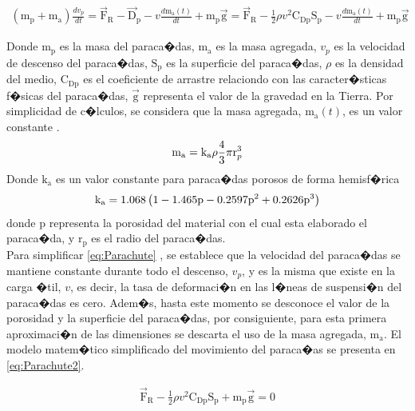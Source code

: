 \documentclass[10pt,a4paper]{book}
\begin{document}
\begin{align}
\label{eq:Parachute}
( \text{m}_{\text{p}} + \text{m}_{\text{a}}) \frac{dv_{p}}{dt} = \overrightarrow{\text{F}}_{\text{R}}- \overrightarrow{\text{D}}_{\text{p}} - v\frac{d\text{m}_{\text{a}}(t)}{dt} + \text{m}_{\text{p}}\overrightarrow{\text{g}}=\overrightarrow{\text{F}}_{\text{R}}- \frac{1}{2}\rho v^{2} \text{C}_{\text{Dp}}\text{S}_{\text{p}} - v\frac{d\text{m}_{\text{a}}(t)}{dt} + \text{m}_{\text{p}}\overrightarrow{\text{g}}
\end{align}

Donde $\text{m}_{\text{p}}$ es la masa del paraca�das, $\text{m}_{\text{a}}$ es la masa agregada, $v_{p}$ es la velocidad de descenso del paraca�das, $\text{S}_{\text{p}}$ es la superficie del paraca�das, $\rho$ es la densidad del medio, $\text{C}_{\text{Dp}}$ es el coeficiente de arrastre relaciondo con las caracter�sticas f�sicas del paraca�das, $\overrightarrow{\text{g}}$ representa el valor de la gravedad en la Tierra.
Por simplicidad de c�lculos, se considera que la masa agregada, $\text{m}_{\text{a}}(t)$, es un valor constante \cite{ModelParachute}.
\begin{align}
\notag
\text{m}_{\text{a}} = \text{k}_{\text{a}}\rho \frac{4}{3}\pi \text{r}_{p}^{3}
\end{align}
Donde $\text{k}_{\text{a}}$ es un valor constante para paraca�das porosos de forma hemisf�rica \cite{ValorKa}
\begin{align}
\notag
\text{k}_{\text{a}} = 1{.}068\left( 1 - 1{.}465\text{p} - 0{.}2597\text{p}^{2} + 0{.}2626\text{p}^{3}\right)
\end{align}
donde $\text{p}$ representa la porosidad  del material con el cual esta elaborado el paraca�da, y $\text{r}_{\text{p}}$ es el radio del paraca�das.\\

Para simplificar \eqref{eq:Parachute} , se establece que la velocidad del paraca�das se mantiene constante durante todo el descenso, $v_{p}$, y es la misma que existe en la carga �til, $v$, es decir, la tasa de deformaci�n en las l�neas de suspensi�n del paraca�das es cero. Adem�s,  hasta este momento se desconoce el valor de la porosidad y la superficie del paraca�das, por consiguiente, para esta primera aproximaci�n de las dimensiones se descarta el uso de la masa agregada, $\text{m}_{\text{a}}$. El modelo matem�tico simplificado del movimiento del paraca�as se presenta en \eqref{eq:Parachute2}.

\begin{align}
\label{eq:Parachute2}
\overrightarrow{\text{F}}_{\text{R}}- \frac{1}{2}\rho v^{2} \text{C}_{\text{Dp}}\text{S}_{\text{p}} + \text{m}_{\text{p}}\overrightarrow{\text{g}} = 0
\end{align}
\end{document}
